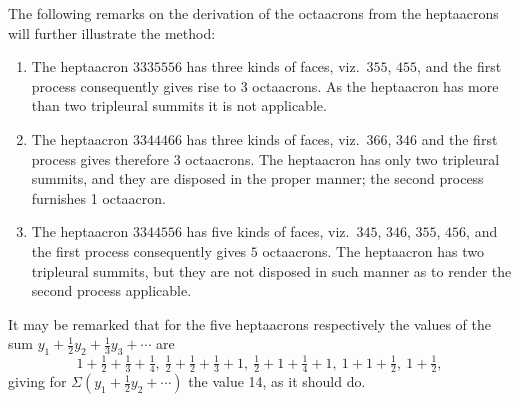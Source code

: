 \documentclass[11pt,a4paper]{article}
\begin{document}
\medskip

The following remarks on the derivation of the octaacrons from the heptaacrons will further illustrate the method:
\begin{enumerate}
\item The heptaacron $3335556$ has three kinds of faces, viz.\ $355$, $455$, and the first process consequently gives rise to 3 octaacrons. As the heptaacron has more than two tripleural summits it is not applicable.
\item The heptaacron $3344466$ has three kinds of faces, viz.\ $366$, $346$ and the first process gives therefore $3$ octaacrons. The heptaacron has only two tripleural summits, and they are disposed in the proper manner; the second process furnishes 1 octaacron.
\item The heptaacron $3344556$ has five kinds of faces, viz.\ $345$, $346$, $355$, $456$, and the first process consequently gives $5$ octaacrons. The heptaacron has two tripleural summits, but they are not disposed in such manner as to render the second process applicable.
\end{enumerate}

\medskip

It may be remarked that for the five heptaacrons respectively the values of the sum $y_1+\tfrac{1}{2}y_2+\tfrac{1}{3}y_3+\cdots$ are
\[
1+\tfrac{1}{2}+\tfrac{1}{3}+\tfrac{1}{4},\ \tfrac{1}{2}+\tfrac{1}{2}+\tfrac{1}{3}+1,\ \tfrac{1}{2}+1+\tfrac{1}{4}+1,\ 1+1+\tfrac{1}{2},\ 1+\tfrac{1}{2},
\]
giving for $\Sigma(y_1+\tfrac{1}{2}y_2+\cdots)$ the value 14, as it should do.

\clearpage

\noindent\par\noindent{}\par

\clearpage
\end{document}
